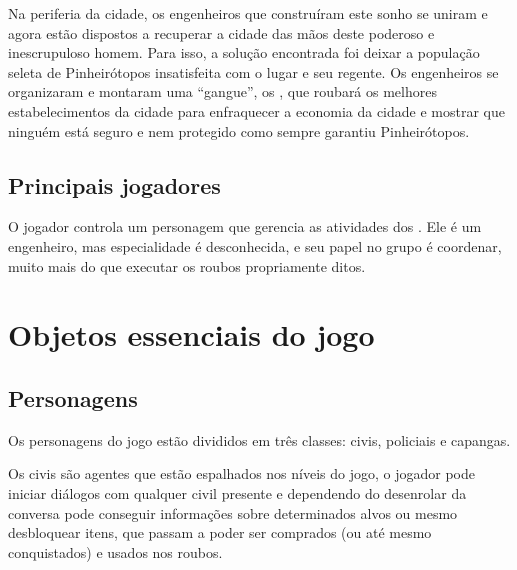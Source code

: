 Na periferia da cidade, os engenheiros que construíram este sonho se uniram e agora estão dispostos a recuperar a cidade das mãos deste poderoso e inescrupuloso homem. Para isso, a solução encontrada foi deixar a população seleta de Pinheirótopos insatisfeita com o lugar e seu regente. Os engenheiros se organizaram e montaram uma “gangue”, os \nomeGrupo{}, que roubará os melhores estabelecimentos da cidade para enfraquecer a economia da cidade e mostrar que ninguém está seguro e nem protegido como sempre garantiu Pinheirótopos.



\subsection{Principais jogadores}

O jogador controla um personagem que gerencia as atividades dos \nomeGrupo. Ele é um engenheiro, mas especialidade é desconhecida, e seu papel no grupo é coordenar, muito mais do que executar os roubos propriamente ditos.

\section{Objetos essenciais do jogo}

\subsection{Personagens}


Os personagens do jogo estão divididos em três classes: civis, policiais e capangas.

Os civis são agentes que estão espalhados nos níveis do jogo, o jogador pode iniciar diálogos com qualquer civil presente e dependendo do desenrolar da conversa pode conseguir informações sobre determinados alvos ou mesmo desbloquear itens, que passam a poder ser comprados (ou até mesmo conquistados) e usados nos roubos.

